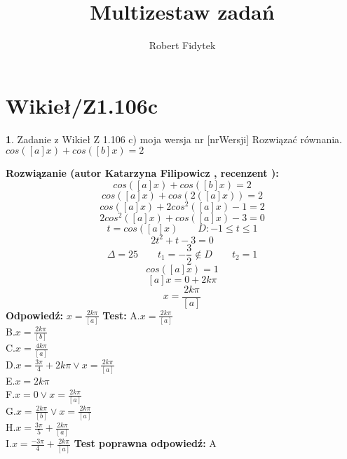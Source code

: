 \documentclass[12pt, a4paper]{article}
\title{Multizestaw zadań}
\author{Robert Fidytek}
\date{}
\theoremstyle{definition} %
\newtheorem{zad}{}
\newcommand{\kategoria}[1]{\section{#1}} %
\newcommand{\zadStart}[1]{\begin{zad}#1\newline} %
\newcommand{\zadStop}{\end{zad}}   %
\newcommand{\rozwStart}[2]{\noindent \textbf{Rozwiązanie (autor #1 , recenzent #2): }\newline} %
\newcommand{\rozwStop}{\newline}                                            %
\newcommand{\odpStart}{\noindent \textbf{Odpowiedź:}\newline}    %
\newcommand{\odpStop}{\newline}                                             %
\newcommand{\testStart}{\noindent \textbf{Test:}\newline} %
\newcommand{\testStop}{\newline} %
\newcommand{\kluczStart}{\noindent \textbf{Test poprawna odpowiedź:}\newline} %
\newcommand{\kluczStop}{\newline} %
\begin{document}
\maketitle


\kategoria{Wikieł/Z1.106c}
\zadStart{Zadanie z Wikieł Z 1.106 c) moja wersja nr [nrWersji]}
Rozwiązać równania.\\
 $cos([a]x)+cos([b]x)=2$
\zadStop
\rozwStart{Katarzyna Filipowicz}{}
$$
cos([a]x)+cos([b]x)=2
$$ $$
cos([a]x)+cos(2([a]x))=2
$$ $$
cos([a]x)+2cos^2([a]x)-1=2
$$ $$
2cos^2([a]x)+cos([a]x)-3=0
$$ $$
t=cos([a]x) \qquad D:-1\leq t \leq 1
$$ $$
2t^2+t-3=0
$$ $$
\Delta=25 \qquad t_1=-\frac{3}{2}\notin D \qquad t_2=1
$$ $$
cos([a]x)=1
$$ $$
[a]x=0+2k\pi
$$ $$
x=\frac{2k\pi}{[a]}
$$
\rozwStop
\odpStart
$x=\frac{2k\pi}{[a]}$
\odpStop
\testStart
A.$x=\frac{2k\pi}{[a]}$\\
B.$x=\frac{2k\pi}{[b]}$\\
C.$x=\frac{4k\pi}{[a]}$\\
D.$x=\frac{3\pi}{4}+2k\pi \vee x=\frac{2k\pi}{[a]}$\\
E.$x=2k\pi$\\
F.$x=0 \vee x=\frac{2k\pi}{[a]}$\\
G.$x=\frac{2k\pi}{[b]} \vee x=\frac{2k\pi}{[a]}$\\
H.$x=\frac{3\pi}{5}+\frac{2k\pi}{[a]}$\\
I.$x=\frac{-3\pi}{4}+\frac{2k\pi}{[a]}$
\testStop
\kluczStart
A
\kluczStop
\end{document}

